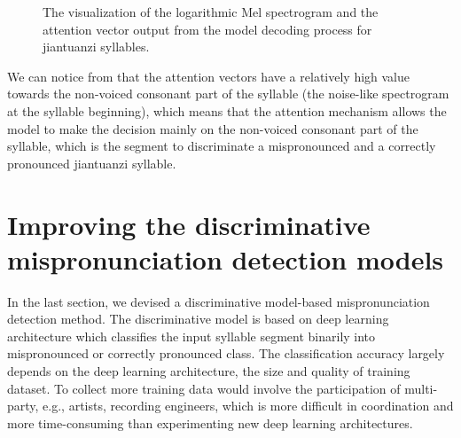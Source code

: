 \begin{figure}[ht!]
  
    \caption[]{The visualization of the logarithmic Mel spectrogram and the attention vector output from the model decoding process for jiantuanzi syllables.}
    \label{fig:ch6:jiantuanzi_att_vector}
\end{figure}


We can notice from  that the attention vectors have a relatively high value towards the non-voiced consonant part of the syllable (the noise-like spectrogram at the syllable beginning), which means that the attention mechanism allows the model to make the decision mainly on the non-voiced consonant part of the syllable, which is the segment to discriminate a mispronounced and a correctly pronounced \gls{jiantuanzi} syllable.

\section{Improving the discriminative mispronunciation detection models}

In the last section, we devised a discriminative model-based mispronunciation detection method. The discriminative model is based on deep learning architecture which classifies the input syllable segment binarily into mispronounced or correctly pronounced class. The classification accuracy largely depends on the deep learning architecture, the size and quality of training dataset. To collect more training data would involve the participation of multi-party, e.g., artists, recording engineers, which is more difficult in coordination and more time-consuming than experimenting new deep learning architectures. 

